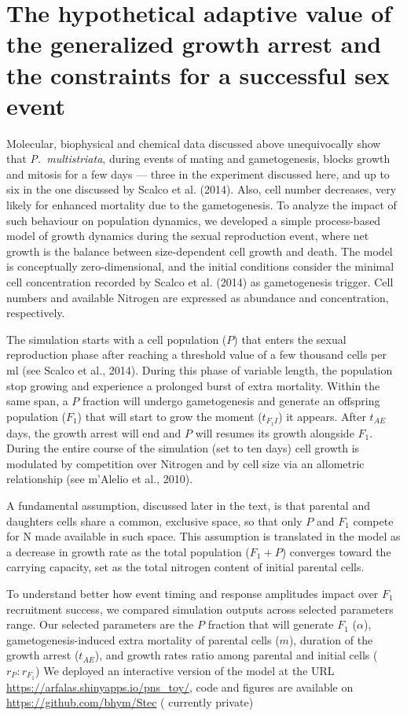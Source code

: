 \documentclass[a4paper,oneside]{article}
\begin{document}
  \section*{The hypothetical adaptive value of the generalized growth arrest and the constraints for a successful sex event}
    Molecular, biophysical and chemical data discussed above unequivocally show that \textit{P.~multistriata}, during events of mating and gametogenesis, blocks growth and mitosis for a few days --- three in the experiment discussed here, and up to six in the one discussed by Scalco et al. (2014).
    Also, cell number decreases, very likely for enhanced mortality due to the gametogenesis.
    To analyze the impact of such behaviour on population dynamics, we developed a simple process-based model of growth dynamics during the sexual reproduction event, where net growth is the balance between size-dependent cell growth and death.
    The model is conceptually zero-dimensional, and the initial conditions consider the minimal cell concentration recorded by Scalco et al. (2014) as gametogenesis trigger.
    Cell numbers and available Nitrogen are expressed as abundance and concentration, respectively.

    The simulation starts with a cell population ($P$) that enters the sexual reproduction phase after reaching a threshold value of a few thousand cells per ml (see Scalco et al., 2014).
    During this phase of variable length, the population stop growing and experience a prolonged burst of extra mortality.
    Within the same span, a $P$ fraction will undergo gametogenesis and generate an offspring population ($F_{1}$) that will start to grow the moment ($t_{F_{1}I}$) it appears.
    After $t_{AE}$ days, the growth arrest will end and $P$ will resumes its growth alongside $F_{1}$.
    During the entire course of the simulation (set to ten days) cell growth is modulated by competition over Nitrogen and by cell size via an allometric relationship (see m'Alelio et al., 2010).

    A fundamental assumption, discussed later in the text, is that parental and daughters cells share a common, exclusive space, so that only $P$ and $F_{1}$ compete for N made available in such space.
    This assumption is translated in the model as a decrease in growth rate as the total population ($F_{1} + P$) converges toward the carrying capacity, set as the total nitrogen content of initial parental cells.

    To understand better how event timing and response amplitudes impact over $F_{1}$ recruitment success, we compared simulation outputs across selected parameters range.
    Our selected parameters are the $P$ fraction that will generate $F_{1}$ ($\alpha$), gametogenesis-induced extra mortality of parental cells ($m$), duration of the growth arrest ($t_{AE}$), and growth rates ratio among parental and initial cells ($r_{P}:r_{F_{1}}$)
    We deployed an interactive version of the model at the URL \url{https://arfalas.shinyapps.io/pns_toy/}, code and figures are available on \url{https://github.com/bhym/Stec} ({\color{red} currently private})
%
\end{document}

